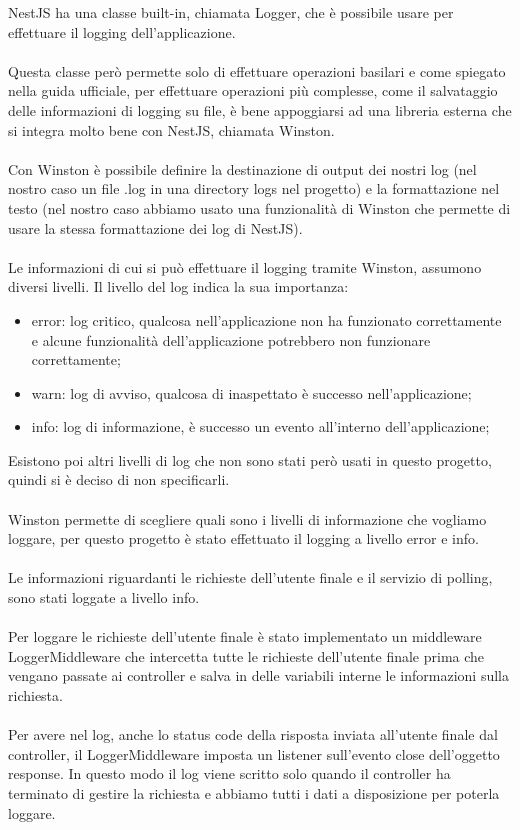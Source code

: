 \leavevmode\newline
NestJS ha una classe built-in, chiamata Logger, che è possibile usare per effettuare il logging 
dell'applicazione. 
\\\\
Questa classe però permette solo di effettuare operazioni basilari e come spiegato nella 
guida ufficiale, per effettuare operazioni più complesse, come il salvataggio delle informazioni di 
logging su file, è bene appoggiarsi ad una libreria esterna che si integra molto bene con NestJS, chiamata
Winston.
\\\\
Con Winston è possibile definire la destinazione di output dei nostri log (nel nostro caso un file .log in una directory logs nel
progetto) e la formattazione nel testo (nel nostro caso abbiamo usato una funzionalità di Winston che permette
di usare la stessa formattazione dei log di NestJS).
\\\\
Le informazioni di cui si può effettuare il logging tramite Winston, assumono diversi livelli. Il livello del log 
indica la sua importanza:
\begin{itemize}
    \item error: log critico, qualcosa nell'applicazione non ha funzionato correttamente e
        alcune funzionalità dell'applicazione potrebbero non funzionare correttamente;
    \item warn: log di avviso, qualcosa di inaspettato è successo nell'applicazione;
    \item info: log di informazione, è successo un evento all'interno dell'applicazione;
\end{itemize}
\leavevmode\newline
Esistono poi altri livelli di log che non sono stati però usati in questo progetto, quindi si è deciso di non specificarli.
\\\\
Winston permette di scegliere quali sono i livelli di informazione che vogliamo loggare, per questo progetto è stato effettuato il logging
a livello error e info.
\\\\
Le informazioni riguardanti le richieste dell'utente finale e il servizio di polling, sono stati loggate a livello info.
\\\\
Per loggare le richieste dell'utente finale è stato implementato un middleware LoggerMiddleware che intercetta tutte le 
richieste dell'utente finale prima che 
vengano passate ai controller e salva in delle variabili interne le informazioni sulla richiesta.
\\\\
Per avere nel log, anche lo status code della risposta inviata all'utente finale dal controller, il LoggerMiddleware imposta un 
listener sull'evento close dell'oggetto response. In questo modo il log viene scritto solo quando il controller ha terminato di
gestire la richiesta e abbiamo tutti i dati a disposizione per poterla loggare.

